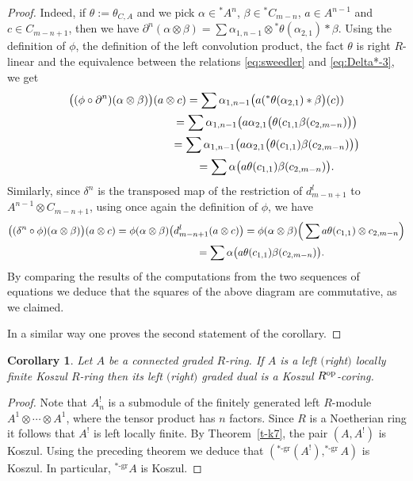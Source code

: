 \documentclass[pdftex]{sigma}
\newcommand\ot{\otimes}
\renewcommand{\^}[1]{\mbox{$^{\left( #1 \right)}$}}
\renewcommand{\_}[1]{\mbox{$_{\left( #1 \right)}$}}
\newcommand{\pa}{\partial}
\newcommand{\al}{\alpha}
\newcommand{\be}{\beta}
\newcommand{\de}{\delta}
\numberwithin{equation}{section}
\newtheorem{Corollary}[Theorem]{Corollary}
\begin{document}
\begin{proof}
Indeed, if $\theta:=\theta_{C,A}$ and we pick $\al\in{}^*\!A^n$, $\be\in{}^*C_{m-n}$, $a\in A^{n-1}$ and $c\in C_{m-n+1}$, then we have $\pa^n(\al\ot\be)=\sum \al_{1,n-1}\ot {}^*\theta(\al_{2,1})\ast\be$. Using the def\/inition of $\phi$, the def\/inition of the left convolution product, the fact $\theta$ is right $R$-linear and the equivalence between the relations \eqref{eq:sweedler} and \eqref{eq:Delta*-3}, we get
\begin{gather*}
\big((\phi\circ\pa^n)(\al\ot\be)\big)(a\ot c) =\sum\al_{1,n-1}\big(a ({}^*\theta(\al_{2,1})\ast\be\big)(c))\\
\hphantom{\big((\phi\circ\pa^n)(\al\ot\be)\big)(a\ot c)}{} =\sum\al_{1,n-1}\big(a\al_{2,1}\big(\theta(c_{1,1}\be(c_{2,m-n})\big)\big)\\
\hphantom{\big((\phi\circ\pa^n)(\al\ot\be)\big)(a\ot c)}{}
=\sum\al_{1,n-1}\big(a\al_{2,1}\big(\theta(c_{1,1})\be(c_{2,m-n})\big)\big)\\
\hphantom{\big((\phi\circ\pa^n)(\al\ot\be)\big)(a\ot c)}{}
=\sum\al\big(a\theta(c_{1,1})\be(c_{2,m-n})\big).
\end{gather*}
Similarly, since $\de^n$ is the transposed map of the restriction of $d^l_{m-n+1}$ to $A^{n-1}\ot C_{m-n+1}$, using once again the def\/inition of $\phi$, we have
\begin{gather*}
 \big((\de^n\circ\phi)(\al\ot\be)\big)(a\ot c) =\phi(\al\ot\be)\big(d^l_{m-n+1}(a\ot c)\big)=\phi(\al\ot\be)\Big(\sum a\theta( c_{1,1})\ot c_{2,m-n}\Big)\\
\hphantom{\big((\de^n\circ\phi)(\al\ot\be)\big)(a\ot c)}{}
 =\sum\al\big(a\theta(c_{1,1})\be(c_{2,m-n})\big).
\end{gather*}
By comparing the results of the computations from the two sequences of equations we deduce that the squares of the above diagram are commutative, as we claimed.

In a similar way one proves the second statement of the corollary.
\end{proof}

\begin{Corollary} \label{cor:aast}
Let $A$ be a connected graded $R$-ring. If $A$ is a left $($right$)$ locally finite Koszul $R$-ring then its left $($right$)$ graded dual is a Koszul $R^{\rm op}$-coring.
\end{Corollary}

\begin{proof}
Note that $A^!_n$ is a submodule of the f\/initely generated left $R$-module $A^1\ot \cdots \ot A^1$, where the tensor product has $n$ factors. Since $R$ is a Noetherian ring it follows that $A^!$ is left locally f\/inite. By Theorem~\ref{t-k7}, the pair $(A,A^!)$ is Koszul. Using the preceding theorem we deduce that $(^{*\text{-gr}}(A^!), ^{*\text{-gr}}\!A)$ is Koszul. In particular,
$^{*\text{-gr}}\!A$ is Koszul.
\end{proof}
\end{document}
